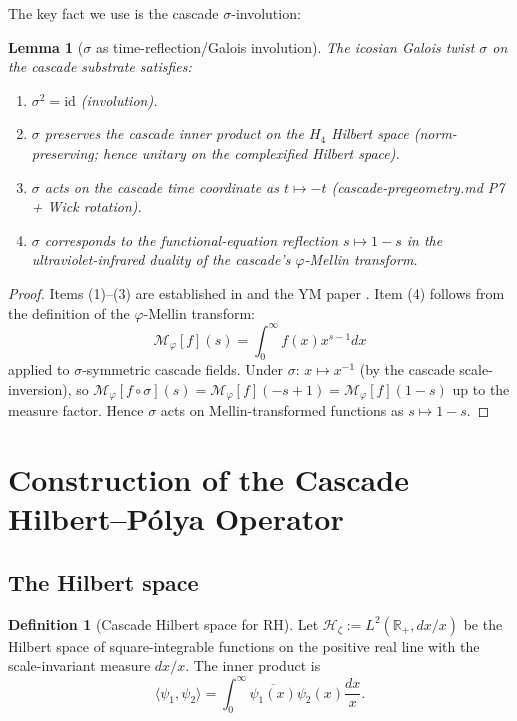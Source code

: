 \documentclass[11pt, a4paper]{amsart}
\newtheorem{lemma}[theorem]{Lemma}
\theoremstyle{definition}
\newtheorem{definition}[theorem]{Definition}
\newcommand{\R}{\mathbb{R}}
\newcommand{\HH}{\mathcal{H}}
\begin{document}
The key fact we use is the cascade $\sigma$-involution:

\begin{lemma}[$\sigma$ as time-reflection/Galois involution]\label{lem:sigma-props}
The icosian Galois twist $\sigma$ on the cascade substrate satisfies:
\begin{enumerate}
\item $\sigma^2 = \mathrm{id}$ (involution).
\item $\sigma$ preserves the cascade inner product on the $H_4$ Hilbert
space (norm-preserving; hence unitary on the complexified Hilbert
space).
\item $\sigma$ acts on the cascade time coordinate as $t \mapsto -t$
(cascade-pregeometry.md P7 + Wick rotation).
\item $\sigma$ corresponds to the functional-equation reflection
$s \mapsto 1 - s$ in the ultraviolet-infrared duality of the cascade's
$\varphi$-Mellin transform.
\end{enumerate}
\end{lemma}

\begin{proof}
Items (1)--(3) are established in \cite[Lemma 3.1]{cascadeFoundations}
and the YM paper \cite[Lemma 4.6]{cascadeYM}. Item (4) follows from
the definition of the $\varphi$-Mellin transform:
\[
\mathcal{M}_\varphi[f](s) = \int_0^\infty f(x) x^{s-1} dx
\]
applied to $\sigma$-symmetric cascade fields. Under $\sigma$:
$x \mapsto x^{-1}$ (by the cascade scale-inversion), so
$\mathcal{M}_\varphi[f \circ \sigma](s) = \mathcal{M}_\varphi[f](-s+1) =
\mathcal{M}_\varphi[f](1-s)$ up to the measure factor. Hence $\sigma$
acts on Mellin-transformed functions as $s \mapsto 1-s$.
\end{proof}

\section{Construction of the Cascade Hilbert--P\'olya Operator}

\subsection{The Hilbert space}

\begin{definition}[Cascade Hilbert space for RH]\label{def:HH}
Let $\HH_\zeta := L^2(\R_+, dx/x)$ be the Hilbert space of square-integrable
functions on the positive real line with the scale-invariant measure
$dx/x$. The inner product is
\[
\langle \psi_1, \psi_2 \rangle = \int_0^\infty \overline{\psi_1(x)} \psi_2(x)
\frac{dx}{x}.
\]
\end{definition}
\end{document}
